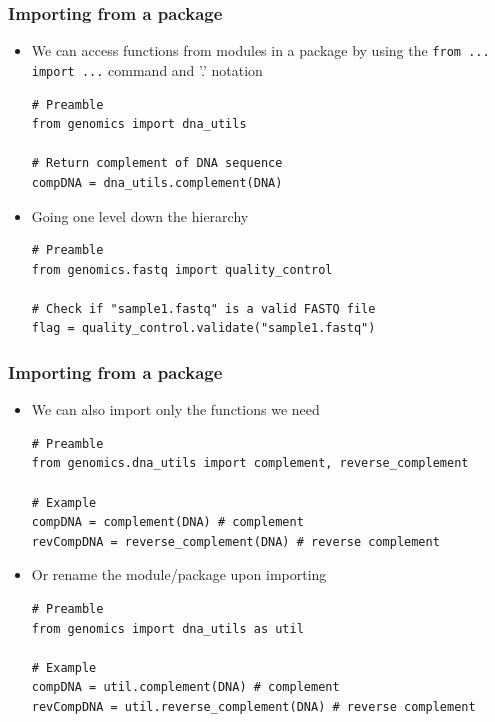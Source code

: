\documentclass[pdf]{beamer}
\begin{document}
\begin{frame}[fragile]
\frametitle{Importing from a package}

\begin{itemize}

\item<1-> We can access functions from modules in a package by using the  
\texttt{from ... import ...} command and '.' notation
\begin{lstlisting}[style=python]
# Preamble
from genomics import dna_utils

# Return complement of DNA sequence
compDNA = dna_utils.complement(DNA)
\end{lstlisting}

\item<2-> Going one level down the hierarchy
\begin{lstlisting}[style=python]
# Preamble
from genomics.fastq import quality_control

# Check if "sample1.fastq" is a valid FASTQ file
flag = quality_control.validate("sample1.fastq")
\end{lstlisting}

\end{itemize}

\end{frame}

\begin{frame}[fragile]
\frametitle{Importing from a package}

\begin{itemize}

\item<1-> We can also import only the functions we need
\begin{lstlisting}[style=python]
# Preamble
from genomics.dna_utils import complement, reverse_complement

# Example
compDNA = complement(DNA) # complement
revCompDNA = reverse_complement(DNA) # reverse complement
\end{lstlisting}

\item<2-> Or rename the module/package upon importing
\begin{lstlisting}[style=python]
# Preamble
from genomics import dna_utils as util

# Example
compDNA = util.complement(DNA) # complement
revCompDNA = util.reverse_complement(DNA) # reverse complement
\end{lstlisting}

\end{itemize}

\end{frame}
\end{document}
